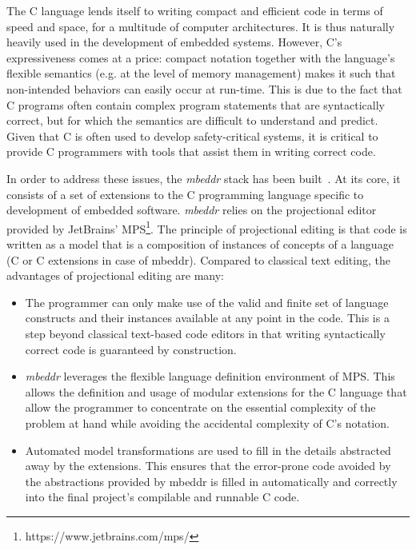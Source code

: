 The C language lends itself to writing compact and efficient code in terms of
speed and space, for a multitude of computer architectures. It is thus naturally
heavily used in the development of embedded systems. However, C's expressiveness
comes at a price: compact notation together with the language's flexible
semantics (e.g. at the level of memory management) makes it such that
non-intended behaviors can easily occur at run-time. This is due to the fact
that C programs often contain complex program statements that are syntactically
correct, but for which the semantics are difficult to understand and predict. Given that C is
often used to develop safety-critical systems, it is critical to provide
C programmers with tools that assist them in writing correct code.

In order to address these issues, the \emph{mbeddr} stack 
has been built~\cite{VoelterRKS13}. At its core, it consists of a set of
extensions to the C programming language specific to development of embedded
software. \emph{mbeddr} relies on the projectional editor provided
by JetBrains’ MPS\footnote{https://www.jetbrains.com/mps/}.
The principle of projectional editing is that code is written as a model that is
a composition of instances of concepts of a language (C or C extensions in case
of mbeddr). Compared to classical text editing, the advantages of projectional
editing are many:

\begin{itemize}
  \item The programmer can only make use of the valid and finite set of language
  constructs and their instances available at any point in the code. This is a
  step beyond classical text-based code editors in that writing syntactically
  correct code is guaranteed by construction.
  \item \emph{mbeddr} leverages the flexible language definition environment of
  MPS. This allows the definition and usage of modular extensions for the C
  language that allow the programmer to concentrate on the essential complexity of the problem
  at hand while avoiding the accidental complexity of C’s notation.
  \item Automated model transformations are used to fill in the
  details abstracted away by the extensions. This ensures that the error-prone
  code avoided by the abstractions provided by mbeddr is filled in automatically
  and correctly into the final project's compilable and runnable C code.
\end{itemize}
